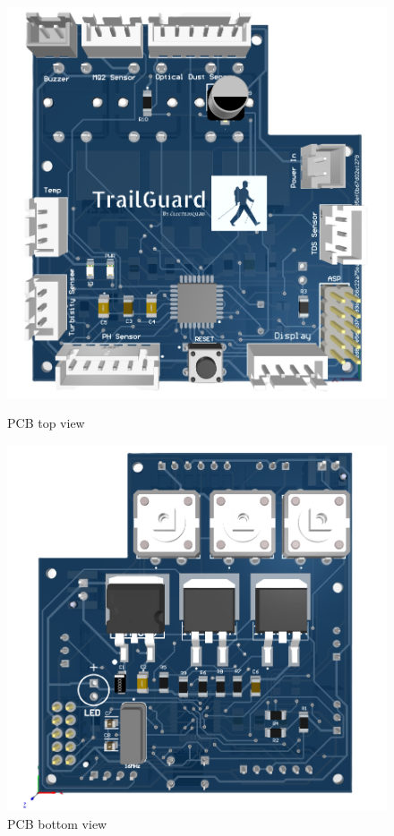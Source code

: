 \documentclass[a4paper,11pt]{article}%
\begin{document}
\begin{figure}[!h]
    \centering
    \begin{minipage}{0.45\textwidth}
        \centering
        \includegraphics[width=\textwidth]{./figures/PCBDesign1.png}
        \caption{PCB top view}
    \end{minipage}\hfill
    \begin{minipage}{0.45\textwidth}
        \centering
        \includegraphics[width=\textwidth]{./figures/PCBDesign2.png}
        \caption{PCB bottom view}
    \end{minipage}
\end{figure}
\newpage
\end{document}
